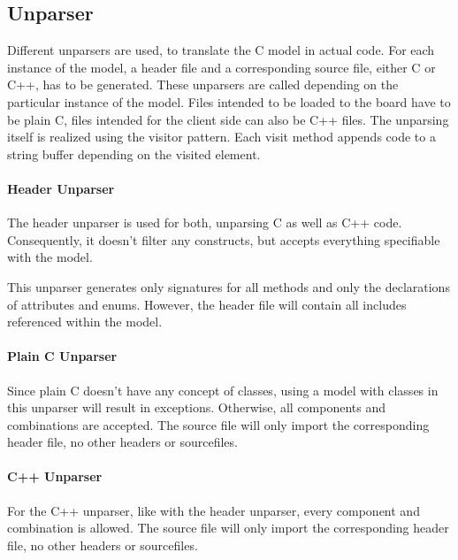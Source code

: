 \documentclass{report}
\begin{document}
\subsection{Unparser}
Different unparsers are used, to translate the C model in actual code. For each instance of the model, a header file and a corresponding source file, either C or C++, has to be generated. These unparsers are called depending on the particular instance of the model. Files intended to be loaded to the board have to be plain C, files intended for the client side can also be C++ files. The unparsing itself is realized using the visitor pattern. Each visit method appends code to a string buffer depending on the visited element.

\paragraph{Header Unparser}
The header unparser is used for both, unparsing C as well as C++ code. Consequently, it doesn't filter any constructs, but accepts everything specifiable with the model.

This unparser generates only signatures for all methods and only the declarations of attributes and enums. However, the header file will contain all includes referenced within the model.

\paragraph{Plain C Unparser}
Since plain C doesn't have any concept of classes, using a model with classes in this unparser will result in exceptions. Otherwise, all components and combinations are accepted. The source file will only import the corresponding header file, no other headers or sourcefiles.

\paragraph{C++ Unparser}
For the C++ unparser, like with the header unparser, every component and combination is allowed. The source file will only import the corresponding header file, no other headers or sourcefiles.


\newpage
\pagestyle{empty}


\end{document}
